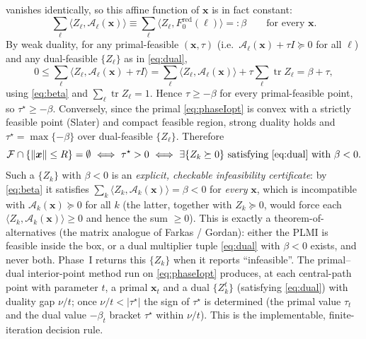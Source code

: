 \documentclass{amsart}
\newcommand{\tr}{\operatorname{tr}}
\begin{document}
vanishes identically, so this affine function of $\bm x$ is in fact constant:
\begin{equation}\label{eq:beta}
  \sum_\ell\big\langle Z_\ell,\mathcal A_\ell(\bm x)\big\rangle
  \equiv\sum_\ell\big\langle Z_\ell,F_0^{\mathrm{red}}(\ell)\big\rangle=:\beta
  \qquad\text{for every }\bm x .
\end{equation}
By weak duality, for any primal-feasible $(\bm x,\tau)$ (i.e.\ $\mathcal A_\ell(\bm
x)+\tau I\succeq0$ for all $\ell$) and any dual-feasible $\{Z_\ell\}$ as in
\eqref{eq:dual},
\[
  0\le\sum_\ell\big\langle Z_\ell,\mathcal A_\ell(\bm x)+\tau I\big\rangle
   =\sum_\ell\big\langle Z_\ell,\mathcal A_\ell(\bm x)\big\rangle+\tau\sum_\ell\tr Z_\ell
   =\beta+\tau,
\]
using \eqref{eq:beta} and $\sum_\ell\tr Z_\ell=1$. Hence $\tau\ge-\beta$ for every
primal-feasible point, so $\tau^\star\ge-\beta$. Conversely, since the primal
\eqref{eq:phaseIopt} is convex with a strictly feasible point (Slater) and compact
feasible region, strong duality holds and $\tau^\star=\max\{-\beta\}$ over
dual-feasible $\{Z_\ell\}$. Therefore
\[
  \mathcal F\cap\{\|\bm x\|\le R\}=\emptyset
  \ \Longleftrightarrow\ \tau^\star>0
  \ \Longleftrightarrow\ \exists\{Z_k\succeq0\}\ \text{satisfying \eqref{eq:dual}}\ \text{with}\ \beta<0 .
\]
Such a $\{Z_k\}$ with $\beta<0$ is an \emph{explicit, checkable infeasibility
certificate}: by \eqref{eq:beta} it satisfies $\sum_k\langle Z_k,\mathcal A_k(\bm
x)\rangle=\beta<0$ for \emph{every} $\bm x$, which is incompatible with $\mathcal
A_k(\bm x)\succeq0$ for all $k$ (the latter, together with $Z_k\succeq0$, would force
each $\langle Z_k,\mathcal A_k(\bm x)\rangle\ge0$ and hence the sum $\ge0$). This is
exactly a theorem-of-alternatives (the matrix analogue of Farkas / Gordan): either the
PLMI is feasible inside the box, or a dual multiplier tuple \eqref{eq:dual} with
$\beta<0$ exists, and never both. Phase~I returns this $\{Z_k\}$ when it reports
``infeasible''. The primal--dual interior-point method run on \eqref{eq:phaseIopt}
produces, at each central-path point with parameter $t$, a primal $\bm x_t$ and a dual
$\{Z_k^t\}$ (satisfying \eqref{eq:dual}) with duality gap $\nu/t$; once
$\nu/t<|\tau^\star|$ the sign of $\tau^\star$ is determined (the primal value $\tau_t$
and the dual value $-\beta_t$ bracket $\tau^\star$ within $\nu/t$). This is the
implementable, finite-iteration decision rule.
\end{document}

